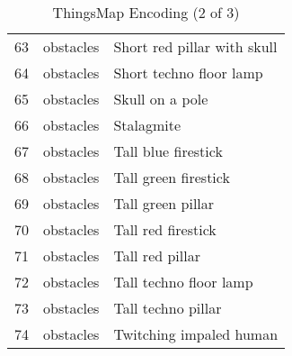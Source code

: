 \begin{table}[b]
\begin{tabularx}{\textwidth}{| c | c | X | }
		63	& obstacles	& Short red pillar with skull \\
		64	& obstacles	& Short techno floor lamp \\
		65	& obstacles	& Skull on a pole \\
		66	& obstacles	& Stalagmite \\
		67	& obstacles	& Tall blue firestick \\
		68	& obstacles	& Tall green firestick \\
		69	& obstacles	& Tall green pillar \\
		70	& obstacles	& Tall red firestick \\
		71	& obstacles	& Tall red pillar \\
		72	& obstacles	& Tall techno floor lamp \\
		73	& obstacles	& Tall techno pillar \\
		74	& obstacles	& Twitching impaled human \\
		
								\hline
	\end{tabularx}
\caption{ThingsMap Encoding (2 of 3)}
\label{tab:thingsmap2}
\end{table}

